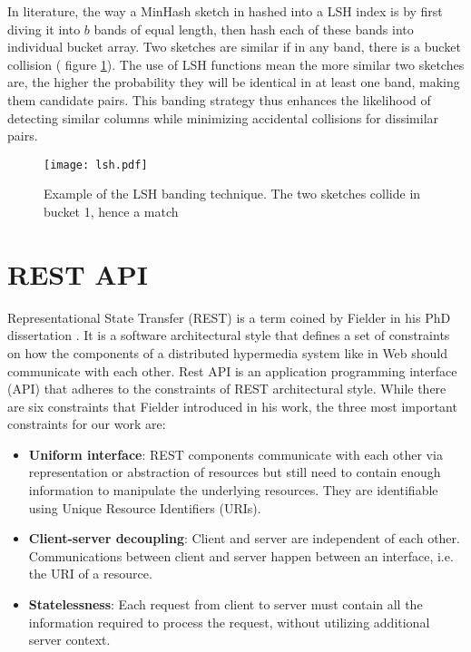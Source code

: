 In literature, the way a MinHash sketch in hashed into a LSH index is by first diving it into \(b\) bands of equal length, then hash each of these bands into individual bucket array. Two sketches are similar if in any band, there is a bucket collision ( figure \ref{fig:lsh}). The use of LSH functions mean the more similar two sketches are, the higher the probability they will be identical in at least one band, making them candidate pairs. This banding strategy thus enhances the likelihood of detecting similar columns while minimizing accidental collisions for dissimilar pairs.

\begin{figure}[h]
\texttt{[image: lsh.pdf]}
\centering
\caption{Example of the LSH banding technique. The two sketches collide in bucket 1, hence a match}
\label{fig:lsh}
\end{figure}

\section{REST API}

Representational State Transfer (REST) is a term coined by Fielder in his PhD dissertation \cite{rest}. It is a software architectural style that defines a set of constraints on how the components of a distributed hypermedia system like in Web should communicate with each other. Rest API is an application programming interface (API) that adheres to the constraints of REST architectural style. While there are six constraints that Fielder introduced in his work, the three most important constraints for our work are:

\begin{itemize}
    \item \textbf{Uniform interface}: REST components communicate with each other via representation or abstraction of resources but still need to contain enough information to manipulate the underlying resources. They are identifiable using Unique Resource Identifiers (URIs).
    \item \textbf{Client-server decoupling}: Client and server are independent of each other. Communications between client and server happen between an interface, i.e. the URI of a resource.
    \item \textbf{Statelessness}: Each request from client to server must contain all the information required to process the request, without utilizing additional server context.
\end{itemize}

